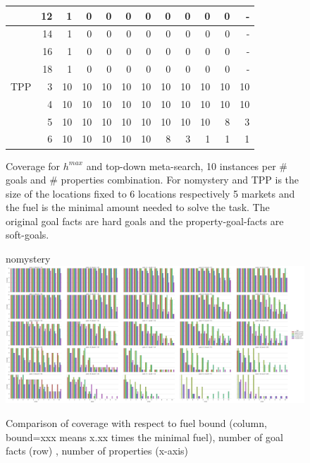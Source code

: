 \begin{figure}[ht]
\begin{tabular}{l|r|rrrrrrrrrr}
				& 12 & 1 & 0 & 0 & 0 & 0 & 0 & 0 & 0 & 0 & - \\\hline 
				& 14 & 1 & 0 & 0 & 0 & 0 & 0 & 0 & 0 & 0 & - \\\hline 
				& 16 & 1 & 0 & 0 & 0 & 0 & 0 & 0 & 0 & 0 & - \\\hline 
				& 18 & 1 & 0 & 0 & 0 & 0 & 0 & 0 & 0 & 0 & - \\\hline\hline
		TPP & 3 & 10 & 10 & 10 & 10 & 10 & 10 & 10 & 10 & 10 & 10\\\hline
			& 4 & 10 & 10 & 10 & 10 & 10 & 10 & 10 & 10 & 10 & 10\\\hline
			& 5 & 10 & 10 & 10 & 10 & 10 & 10 & 10 & 10 & 8 & 3\\\hline
			& 6 & 10 & 10 & 10 & 10 & 10 & 8 & 3 & 1 & 1 & 1\\\hline


	\end{tabular}
	\caption{Coverage for $h^{max}$ and top-down meta-search, 10 instances per \# goals and \# properties combination.
	For nomystery and TPP is the size of the locations fixed to 6 locations respectively 5 markets and the fuel is the 
	minimal amount needed to solve the task.
	The original goal facts are hard goals and the property-goal-facts are soft-goals.}
\end{figure}


\begin{figure}[ht]
	\centering
	nomystery
	\includegraphics[scale=0.2]{data/action_set_properties/coverage_nomystery.pdf}
	\caption{Comparison of coverage with respect to fuel bound (column, bound=xxx means x.xx times the minimal fuel), number of goal facts (row)
		, number of properties (x-axis)}
\end{figure}
